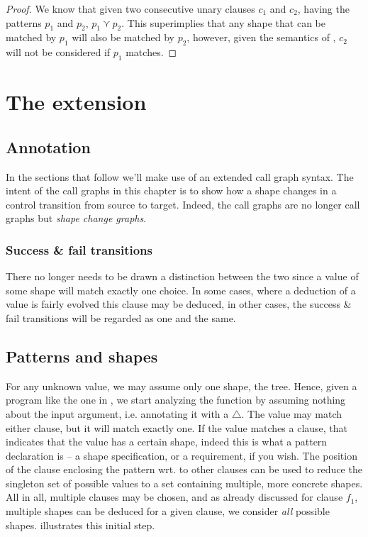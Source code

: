 \begin{proof} We know that given two consecutive unary clauses $c_1$ and $c_2$,
having the patterns $p_1$ and $p_2$, $p_1\curlyvee p_2$. This superimplies that
any shape that can be matched by $p_1$ will also be matched by $p_2$, however,
given the semantics of \D{}, $c_2$ will not be considered if $p_1$
matches.\end{proof}

\section{The extension}

\subsection{Annotation}

In the sections that follow we'll make use of an extended call graph syntax.
The intent of the call graphs in this chapter is to show how a shape changes in
a control transition from source to target. Indeed, the call graphs are no
longer call graphs but \emph{shape change graphs}.

\subsubsection{Success \& fail transitions}

There no longer needs to be drawn a distinction between the two since a value
of some shape will match exactly one choice. In some cases, where a deduction
of a value is fairly evolved this clause may be deduced, in other cases, the
success \& fail transitions will be regarded as one and the same. 

\subsection{Patterns and shapes}

For any unknown value, we may assume only one shape, the tree. Hence, given a
program like the one in , we start analyzing
the function  by assuming nothing about the input argument, i.e.
annotating it with a $\bigtriangleup$. The value may match either clause, but
it will match exactly one. If the value matches a clause, that indicates that
the value has a certain shape, indeed this is what a pattern declaration is --
a shape specification, or a requirement, if you wish. The position of the
clause enclosing the pattern wrt. to other clauses can be used to reduce the
singleton set of possible values to a set containing multiple, more concrete
shapes. All in all, multiple clauses may be chosen, and as already discussed
for clause $f_1$, multiple shapes can be deduced for a given clause, we
consider \emph{all} possible shapes.
 illustrates this initial step.

